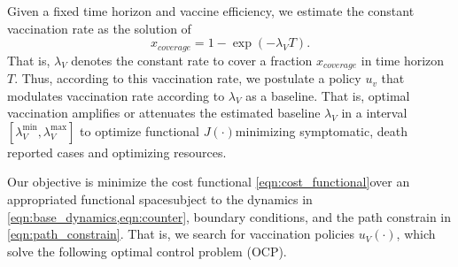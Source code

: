     Given a fixed time horizon and vaccine efficiency,
we estimate the constant vaccination rate as the solution of
\begin{equation}
    x_{coverage} = 1 - \exp(-\lambda_V T).
\end{equation}
    That is, $\lambda_V$ denotes the constant rate
to cover  a fraction $x_{coverage}$ in time horizon $T$.
Thus, according to this vaccination rate, we postulate a policy $u_v$ that
modulates vaccination rate according to $\lambda_V$ as a baseline. That is,
optimal vaccination amplifies or attenuates the estimated baseline
$\lambda_V$ in a interval $[\lambda_V^{\min}, \lambda_V^{\max}]$
to optimize functional $J(\cdot)$\textemdash minimizing
symptomatic, death reported cases and optimizing resources.

    Our objective is minimize the cost functional
\eqref{eqn:cost_functional}\textemdash over an appropriated functional
space\textemdash subject to the dynamics in
\cref{eqn:base_dynamics,eqn:counter}, boundary conditions, and the path
constrain in \eqref{eqn:path_constrain}.
That is, we search for vaccination policies $u_V(\cdot)$, which
solve the following optimal control problem (OCP).

